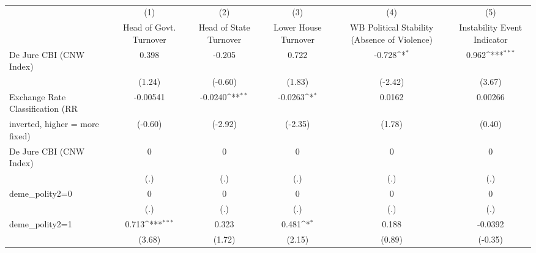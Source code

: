 \begin{table}[htbp]\centering
\def\sym#1{\ifmmode^{#1}\else\(^{#1}\)\fi}
\caption{\label{binarydemcmultIndFEDJ}}
\begin{tabular}{l*{5}{c}}
\toprule
                                        &\multicolumn{1}{c}{(1)}&\multicolumn{1}{c}{(2)}&\multicolumn{1}{c}{(3)}&\multicolumn{1}{c}{(4)}&\multicolumn{1}{c}{(5)}\\
                                        &\multicolumn{1}{c}{Head of Govt. Turnover}&\multicolumn{1}{c}{Head of State Turnover}&\multicolumn{1}{c}{Lower House Turnover}&\multicolumn{1}{c}{WB Political Stability (Absence of Violence)}&\multicolumn{1}{c}{Instability Event Indicator}\\
\midrule
De Jure CBI (CNW Index)                 &    0.398         &   -0.205         &    0.722         &   -0.728\sym{*}  &    0.962\sym{***}\\
                                        &   (1.24)         &  (-0.60)         &   (1.83)         &  (-2.42)         &   (3.67)         \\
\addlinespace
Exchange Rate Classification (RR        & -0.00541         &  -0.0240\sym{**} &  -0.0263\sym{*}  &   0.0162         &  0.00266         \\
inverted, higher = more fixed)          &  (-0.60)         &  (-2.92)         &  (-2.35)         &   (1.78)         &   (0.40)         \\
\addlinespace
De Jure CBI (CNW Index)                 &        0         &        0         &        0         &        0         &        0         \\
                                        &      (.)         &      (.)         &      (.)         &      (.)         &      (.)         \\
\addlinespace
deme\_polity2=0                          &        0         &        0         &        0         &        0         &        0         \\
                                        &      (.)         &      (.)         &      (.)         &      (.)         &      (.)         \\
\addlinespace
deme\_polity2=1                          &    0.713\sym{***}&    0.323         &    0.481\sym{*}  &    0.188         &  -0.0392         \\
                                        &   (3.68)         &   (1.72)         &   (2.15)         &   (0.89)         &  (-0.35)         \\

\end{tabular}
\end{table}
